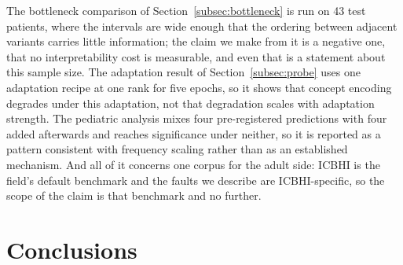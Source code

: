 \documentclass[journal,onecolumn]{IEEEtran}
\begin{document}
The bottleneck comparison of Section~\ref{subsec:bottleneck} is run on 43 test patients,
where the intervals are wide enough that the ordering between adjacent variants carries
little information; the claim we make from it is a negative one, that no
interpretability cost is measurable, and even that is a statement about this sample
size. The adaptation result of Section~\ref{subsec:probe} uses one adaptation recipe at
one rank for five epochs, so it shows that concept encoding degrades under this
adaptation, not that degradation scales with adaptation strength. The pediatric analysis
mixes four pre-registered predictions with four added afterwards and reaches
significance under neither, so it is reported as a pattern consistent with frequency
scaling rather than as an established mechanism. And all of it concerns one corpus for
the adult side: ICBHI is the field's default benchmark and the faults we describe are
ICBHI-specific, so the scope of the claim is that benchmark and no further.

\section{Conclusions}
\label{sec:conclusion}
\end{document}
